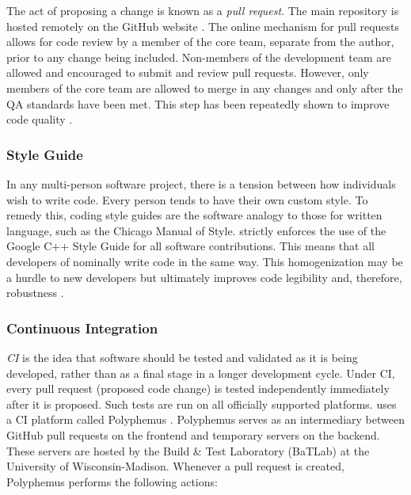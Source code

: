 The act of proposing a change is known as a \emph{pull request}. The main \Cyclus repository is 
hosted remotely on the GitHub website \cite{dabbish_social_2012}. The online
mechanism for pull requests allows for code review by a member of the \Cyclus 
core team, separate from the author, prior to any change being included. Non-members
of the \Cyclus development team are allowed and encouraged to submit and review 
pull requests. However, only members of the \Cyclus core team are allowed to 
merge in any changes and only after the \gls{QA} standards have been met. This 
step has been repeatedly shown to improve code quality \cite{cohen_modern_2010}.

\subsubsection{Style Guide}

In any multi-person software project, there is a tension between how individuals
wish to write code. Every person tends to have their own custom style. To remedy this,
coding style guides are the software analogy to those for written language,
such as the Chicago Manual of Style. \Cyclus strictly enforces the use of the 
Google C++ Style Guide \cite{weinberger_google_2008} for all software contributions.
This means that all developers of \Cyclus nominally write \Cyclus code in the same 
way.  This homogenization may be a hurdle to new developers but ultimately 
improves code legibility and, therefore, robustness \cite{cohen_modern_2010}.

\subsubsection{Continuous Integration}
\label{sec:qa-ci}

\emph{\acrfull{CI}} is the idea that software should be tested and validated 
as it is being developed, rather than as a final stage in a longer development 
cycle.  Under \gls{CI}, every pull request (proposed code change) is tested independently immediately after 
it is proposed. Such tests are run on all officially supported platforms. 
\Cyclus uses a \gls{CI} platform called Polyphemus \cite{scopatz_polyphemus_2014}. Polyphemus serves as an intermediary between GitHub pull requests on the frontend 
and temporary \Cyclus servers on the backend. These servers are hosted by 
the Build \& Test Laboratory (BaTLab) \cite{uw_batlab_team_batlab_2014} at the University of 
Wisconsin-Madison. Whenever a pull request is created, Polyphemus performs 
the following actions:

